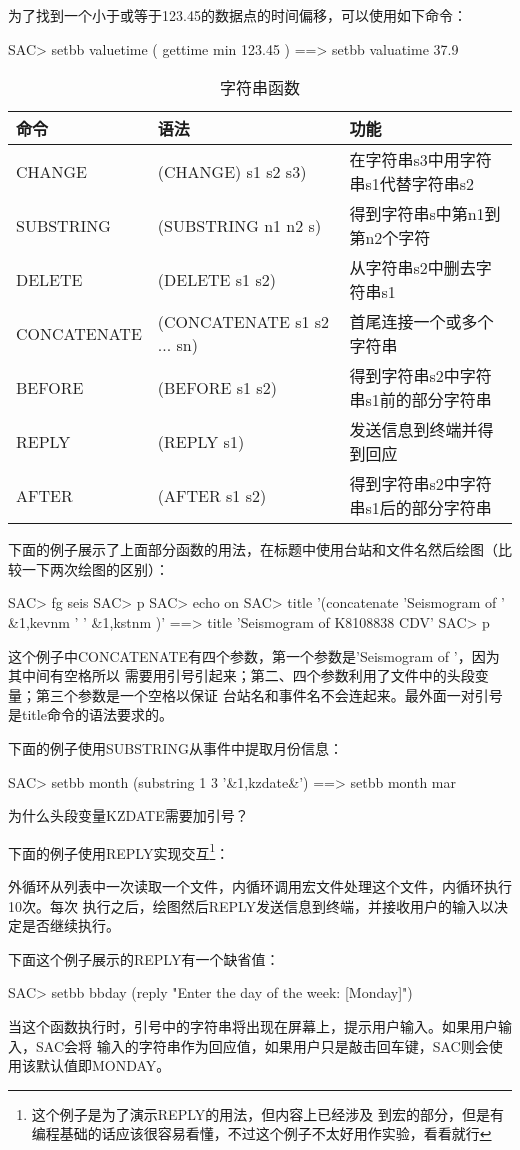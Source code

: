 为了找到一个小于或等于123.45的数据点的时间偏移，可以使用如下命令：
\begin{SACCode}
SAC> setbb valuetime ( gettime min 123.45 )
 ==> setbb valuatime 37.9 
\end{SACCode}

\begin{table}[h]
\caption{字符串函数}
\centering
\begin{tabular}{p{2.73cm}p{4.88cm}p{7.1cm}}
	\toprule
	命令	&	语法	&	功能	\\
	\midrule
	CHANGE	&	(CHANGE) s1 s2 s3) 	&	在字符串s3中用字符串s1代替字符串s2	\\
	SUBSTRING&	(SUBSTRING n1 n2 s) &	得到字符串s中第n1到第n2个字符\\
	DELETE	&	(DELETE s1 s2)		&	从字符串s2中删去字符串s1	\\
	CONCATENATE&	(CONCATENATE s1 s2 ... sn)	&	首尾连接一个或多个字符串\\
	BEFORE	&	(BEFORE s1 s2)	&	得到字符串s2中字符串s1前的部分字符串\\
	REPLY	&	(REPLY s1)	&	发送信息到终端并得到回应	\\
	AFTER	&	(AFTER s1 s2)	&	得到字符串s2中字符串s1后的部分字符串\\
	\bottomrule
\end{tabular}
\end{table}

下面的例子展示了上面部分函数的用法，在标题中使用台站和文件名然后绘图（比较一下两次绘图的区别）：
\begin{SACCode}
SAC> fg seis
SAC> p
SAC> echo on
SAC> title '(concatenate 'Seismogram of ' &1,kevnm ' ' &1,kstnm )'
 ==> title 'Seismogram of K8108838 CDV'
SAC> p
\end{SACCode}
这个例子中CONCATENATE有四个参数，第一个参数是'Seismogram of '，因为其中间有空格所以
需要用引号引起来；第二、四个参数利用了文件中的头段变量；第三个参数是一个空格以保证
台站名和事件名不会连起来。最外面一对引号是title命令的语法要求的。

下面的例子使用SUBSTRING从事件中提取月份信息：
\begin{SACCode}
SAC> setbb month (substring 1 3 '&1,kzdate&')
 ==> setbb month mar
\end{SACCode}
为什么头段变量KZDATE需要加引号？

下面的例子使用REPLY实现交互\footnote{这个例子是为了演示REPLY的用法，但内容上已经涉及
到宏的部分，但是有编程基础的话应该很容易看懂，不过这个例子不太好用作实验，看看就行}：
外循环从列表中一次读取一个文件，内循环调用宏文件处理这个文件，内循环执行10次。每次
执行之后，绘图然后REPLY发送信息到终端，并接收用户的输入以决定是否继续执行。

下面这个例子展示的REPLY有一个缺省值：
\begin{SACCode}
SAC> setbb bbday (reply "Enter the day of the week: [Monday]") 
\end{SACCode}
当这个函数执行时，引号中的字符串将出现在屏幕上，提示用户输入。如果用户输入，SAC会将
输入的字符串作为回应值，如果用户只是敲击回车键，SAC则会使用该默认值即MONDAY。
